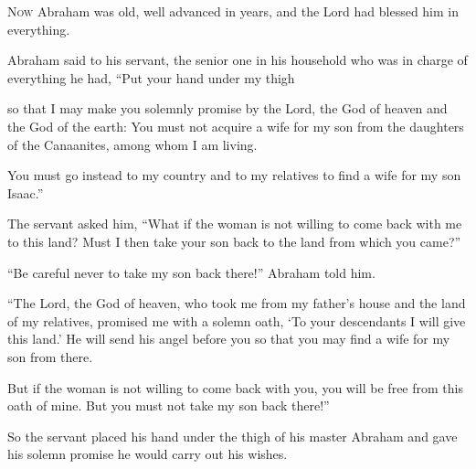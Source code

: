 \begin{scripture}
 \allowchapbreak\hypertarget{ch-genesis-24}{}\lettrine[lines=5]{\color{pentateuch}N}{\textsc{ow}} Abraham was old, well advanced in years, and the Lord had blessed him in everything.\everypar{}
 Abraham said to his servant, the senior one in his household who was in charge of everything he had, ``Put your hand under my thigh
 so that I may make you solemnly promise by the Lord, the God of heaven and the God of the earth: You must not acquire a wife for my son from the daughters of the Canaanites, among whom I am living.
 You must go instead to my country and to my relatives to find a wife for my son Isaac.''
\everypar{}

 The servant asked him, ``What if the woman is not willing to come back with me to this land? Must I then take your son back to the land from which you came?''
\everypar{}

 ``Be careful never to take my son back there!'' Abraham told him.
 ``The Lord, the God of heaven, who took me from my father's house and the land of my relatives, promised me with a solemn oath, `To your descendants I will give this land.' He will send his angel before you so that you may find a wife for my son from there.
 But if the woman is not willing to come back with you, you will be free from this oath of mine. But you must not take my son back there!''
 So the servant placed his hand under the thigh of his master Abraham and gave his solemn promise he would carry out his wishes.
\everypar{}


\end{scripture}
